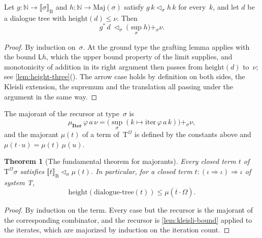 \documentclass[11pt]{amsart}
\makeatletter
\newcommand{\N}{\mathbb{N}}
\newcommand{\Dial}{\mathrm{B}}
\newcommand{\TmO}{\mathrm{T}^{\Omega}}
\newcommand{\gr}{\iota}                      %
\newcommand{\arr}{\Rightarrow}
\newcommand{\dsem}[1]{\llbracket #1 \rrbracket_{\Dial}}
\newcommand{\dtree}{\mathrm{dialogue\text{-}tree}}
\newcommand{\height}{\mathrm{height}}
\newcommand{\kext}[1]{#1^{*}}                %
\newcommand{\iterop}{\mathrm{iter}}
\newcommand{\Iterc}{\mathbf{Iter}}
\newcommand{\bL}{\mathsf{L}}
\newcommand{\bplus}{\mathbin{+}}
\newcommand{\Maj}{\mathrm{Maj}}
\newcommand{\maj}{\mathrel{\lhd}}             %
\newcommand{\Mj}{\mu}                         %
\newif\ifagdarefs
\newcommand{\AgdaRefs}[1]{\ifagdarefs{\footnotesize\color{agdablue}(#1)}\else\unskip\fi}
\newcommand{\Agda}[2]{{\footnotesize\color{agdablue}\textsf{#1}%
  \ifblank{#2}{}{\texttt{.}\allowbreak\texttt{#2}}}}
\let\ttt@plain\texttt
\renewcommand{\texttt}[1]{{\footnotesize\color{agdablue}\ttt@plain{#1}}}
\theoremstyle{plain}
\newtheorem{theorem}{Theorem}[section]
\theoremstyle{definition}
\makeatother
\begin{document}
\begin{lemma}
\label{lem:kleisli-bound}
Let $g : \N \to \dsem\sigma$ and $h : \N \to \Maj(\sigma)$ satisfy
$g\,k \maj_{\sigma} h\,k$ for every~$k$, and let $d$ be a dialogue tree
with $\height(d) \le \nu$. Then
\[
  \kext g\,d \ \maj_{\sigma}\
  \big(\textstyle\sup_{\sigma} h\big) \bplus_{\sigma} \nu .
\]
\AgdaRefs{\Agda{DialogueTrees.MajorantAll}{R-Kleisli}.}
\end{lemma}

\begin{proof}
By induction on~$\sigma$. At the ground type the grafting lemma
applies with the bound $\bL h$, which the upper bound property of the
limit supplies, and monotonicity of addition in its right argument
then passes from $\height(d)$ to~$\nu$; see
\cref{lem:height-three}(). The arrow case holds
by definition on both
sides, the Kleisli extension, the supremum and the translation all
passing under the argument in the same way.
\end{proof}

\begin{definition}
\label{def:majorant-term}
The majorant of the recursor at type~$\sigma$ is
\[
  \Mj_{\Iterc}\,\varphi\,a\,\nu
  = \big(\textstyle\sup_{\sigma}(k \mapsto \iterop\,\varphi\,a\,k)\big)
     \bplus_{\sigma} \nu ,
\]
and the majorant $\Mj(t)$ of a term of~$\TmO$ is defined by the
constants above and $\Mj(t\cdot u) = \Mj(t)\,\Mj(u)$.
\AgdaRefs{\Agda{DialogueTrees.MajorantAll}{μ-Iterᵀ}; \texttt{μᵀ},
\texttt{R-Iterᵀ}.}
\end{definition}

\begin{theorem}[The fundamental theorem for majorants]
\label{thm:fundamental-majorant}
Every closed term $t$ of~$\TmO\sigma$ satisfies
$\dsem t \maj_{\sigma} \Mj(t)$. In particular, for a closed term
$t : (\gr\arr\gr)\arr\gr$ of system T,
\[
  \height(\dtree(t)) \le \Mj(\overline t \cdot \Omega) .
\]
\AgdaRefs{\Agda{DialogueTrees.MajorantAll}{fundamentalᵀ};
\texttt{dialogue-tree-height-≤-μᵀ}.}
\end{theorem}

\begin{proof}
By induction on the term. Every case but the recursor is the majorant
of the corresponding combinator, and the recursor is
\cref{lem:kleisli-bound} applied to the iterates, which are majorized
by induction on the iteration count.
\end{proof}
\end{document}
